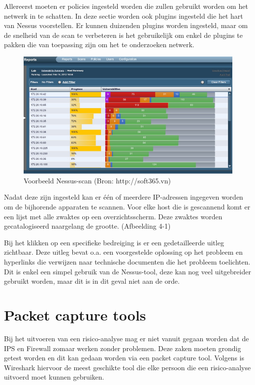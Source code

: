 \documentclass[pdftex,a4paper,12pt]{report}
\begin{document}
Allereerst moeten er policies ingesteld worden die zullen gebruikt worden om het netwerk in te schatten. In deze sectie worden ook plugins ingesteld die het hart van Nessus voorstellen. Er kunnen duizenden plugins worden ingesteld, maar om de snelheid van de scan te verbeteren is het gebruikelijk om enkel de plugins te pakken die van toepassing zijn om het te onderzoeken netwerk. \newline

\begin{figure}[H]
\begin{center}
\includegraphics[scale=0.60]{img/Nessus1}
\end{center}
\caption{Voorbeeld Nessus-scan (Bron: http://soft365.vn)}
\end{figure}

Nadat deze zijn ingesteld kan er één of meerdere IP-adressen ingegeven worden om de bijhorende apparaten te scannen. Voor elke host die is gescannend komt er een lijst met alle zwaktes op een overzichtsscherm. Deze zwaktes worden gecatalogiseerd naargelang de grootte. (Afbeelding 4-1) \newline

Bij het klikken op een specifieke bedreiging is er een gedetailleerde uitleg zichtbaar. Deze uitleg bevat o.a. een voorgestelde oplossing op het probleem en hyperlinks die verwijzen naar technische documenten die het probleem toelichten. Dit is enkel een simpel gebruik van de Nessus-tool, deze kan nog veel uitgebreider gebruikt worden, maar dit is in dit geval niet aan de orde. \citep{Jackson2010}

\section{Packet capture tools}
Bij het uitvoeren van een risico-analyse mag er niet vanuit gegaan worden dat de IPS en Firewall zomaar werken zonder problemen. Deze zaken moeten grondig getest worden en dit kan gedaan worden via een packet capture tool. Volgens \cite{Jackson2010} is Wireshark hiervoor de meest geschikte tool die elke persoon die een risico-analyse uitvoerd moet kunnen gebruiken. \newline
\end{document}
